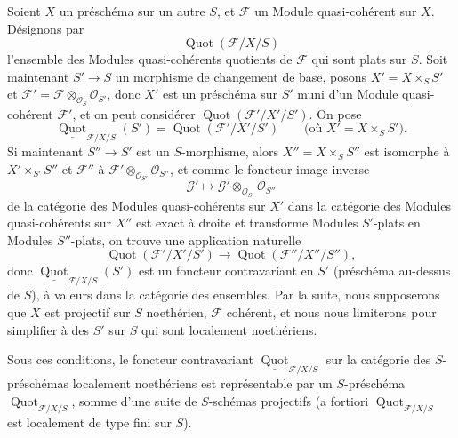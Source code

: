 
Soient $X$ un préschéma sur un autre $S$, et $\mathcal F$ un Module
quasi-cohérent sur $X$. Désignons par
\[
\operatorname{Quot}(\mathcal F/X/S)
\]
l'ensemble des Modules quasi-cohérents quotients de $\mathcal F$ qui sont plats
sur $S$. Soit maintenant $S'\longrightarrow S$ un morphisme de changement de
base, posons $X'=X\times_S S'$ et
$\mathcal F'=\mathcal F\otimes_{\mathcal O_S}\mathcal O_{S'}$, donc $X'$ est
un préschéma sur $S'$ muni d'un Module
quasi-cohérent $\mathcal F'$, et on peut considérer
$\operatorname{Quot}(\mathcal F'/X'/S')$. On pose
\[
\underline{\operatorname{Quot}}_{\mathcal F/X/S}(S')
=\operatorname{Quot}(\mathcal F'/X'/S')
\qquad\text{(où $X'=X\times_SS'$)}.
\]
Si maintenant $S''\longrightarrow S'$ est un $S$-morphisme, alors
$X''=X\times_SS''$ est isomorphe à $X'\times_{S'}S''$ et $\mathcal F''$ à
$\mathcal F'\otimes_{\mathcal O_{S'}}\mathcal O_{S''}$, et comme le foncteur
image inverse
\[
\mathcal G'\longmapsto
\mathcal G'\otimes_{\mathcal O_{S'}}\mathcal O_{S''}
\]
de la catégorie des Modules quasi-cohérents sur $X'$ dans la catégorie des
Modules quasi-cohérents sur $X''$ est exact à droite et transforme Modules
$S'$-plats en Modules $S''$-plats, on trouve une application naturelle
\[
\operatorname{Quot}(\mathcal F'/X'/S')\longrightarrow
\operatorname{Quot}(\mathcal F''/X''/S''),
\]
donc $\underline{\operatorname{Quot}}_{\mathcal F/X/S}(S')$ est un foncteur
contravariant en $S'$ (préschéma au-dessus de $S$), à valeurs dans la catégorie
des ensembles. Par la suite, nous supposerons que $X$ est projectif sur $S$
noethérien, $\mathcal F$ cohérent, et nous nous limiterons pour simplifier à
des $S'$ sur $S$ qui sont localement noethériens.

 Sous ces conditions, le foncteur contravariant
$\underline{\operatorname{Quot}}_{\mathcal F/X/S}$ sur la catégorie des
$S$-préschémas localement noethériens est représentable par un $S$-préschéma
$\operatorname{Quot}_{\mathcal F/X/S}$, somme d'une suite de $S$-schémas
projectifs (a fortiori $\operatorname{Quot}_{\mathcal F/X/S}$ est localement de
type fini sur $S$).

